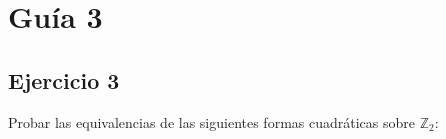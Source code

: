 \documentclass[12pt]{amsart}
\newcommand{\QQ}{\mathbb{Q}}
\newcommand{\ZZ}{\mathbb{Z}}
\newcommand{\lp}{\left(}
\newcommand{\rp}{\right)}
\theoremstyle{plain}
\begin{document}




\section*{Guía 3}


\subsection*{Ejercicio 3} Probar las equivalencias de las siguientes
formas cuadráticas sobre $\ZZ_2$:
\end{document}
